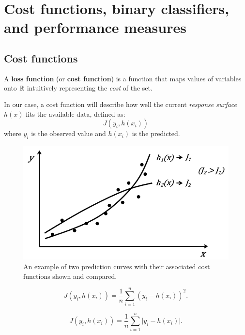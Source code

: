 \chapter{Cost functions, binary classifiers, and performance measures}
\section{Cost functions}

\begin{definition}
    A \textbf{loss function} (or \textbf{cost function})
    is a function that maps values of variables onto $\mathbb{R}$
    intuitively representing the \emph{cost} of the set.
\end{definition}

In our case, a cost function will describe how well the current
\emph{response surface} $h(x)$ fits the available data, defined as:
\[
    J(y_i, h(x_i))
\]
where $y_i$ is the observed value and $h(x_i)$ is the predicted.

\begin{figure}[]
    \centering
    \includegraphics[width=0.8\linewidth]{images/cost-function.png}
    \caption{
        An example of two prediction curves with their associated cost
        functions shown and compared.
    }
    \label{fig:cost-function}
\end{figure}

\begin{definition}
    \[
        J(y_i, h(x_i)) = \frac 1n \sum_{i=1}^n (y_i - h(x_i))^2.
    \]
\end{definition}

\begin{definition}
    \[
        J(y_i, h(x_i)) = \frac 1n \sum_{i=1}^n \lvert y_i - h(x_i) \rvert.
    \]
\end{definition}

